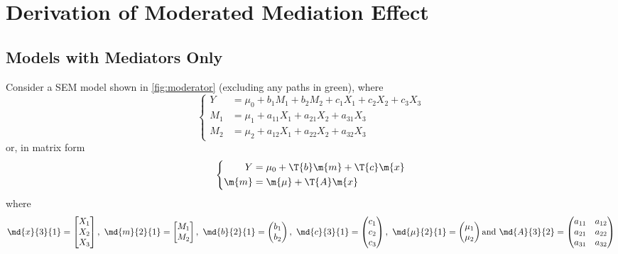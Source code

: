 \chapter{Derivation of Moderated Mediation Effect}

\section{Models with Mediators Only}

Consider a SEM model 
shown in \cref{fig:moderator} (excluding any paths in green), where
\begin{equation*}
    \left\{
    \begin{aligned}
        Y &= \mu_0 + b_1M_1 + b_2M_2 + c_1X_1 + c_2X_2 + c_3X_3\\
        M_1 &= \mu_1 + a_{11}X_1 + a_{21}X_2 + a_{31}X_3\\
        M_2 &= \mu_2 + a_{12}X_1 + a_{22}X_2 + a_{32}X_3
    \end{aligned}
    \right.
\end{equation*}
or, in matrix form
\begin{equation}
    \left\{
    \begin{aligned}
        Y &= \mu_0 + \T{b}\m{m} + \T{c}\m{x}\\
        \m{m} &= \m{\mu} + \T{A}\m{x}
    \end{aligned}
    \right.
\end{equation}
where
\begin{equation*}\label{eq:0}
    \md{x}{3}{1} =
        \begin{bmatrix}
            X_1\\
            X_2\\
            X_3
        \end{bmatrix},\ 
    \md{m}{2}{1} =
        \begin{bmatrix}
            M_1\\
            M_2
        \end{bmatrix},\ 
    \md{b}{2}{1} =
        \begin{pmatrix}
            b_1\\
            b_2
        \end{pmatrix},\ 
    \md{c}{3}{1} =
        \begin{pmatrix}
            c_1\\
            c_2\\
            c_3
        \end{pmatrix},\ 
    \md{\mu}{2}{1} =
        \begin{pmatrix}
            \mu_1\\
            \mu_2
        \end{pmatrix}\text{and}\ 
    \md{A}{3}{2} =
        \begin{pmatrix}
            a_{11}    &a_{12}\\
            a_{21}    &a_{22}\\
            a_{31}    &a_{32}
        \end{pmatrix}
\end{equation*}

